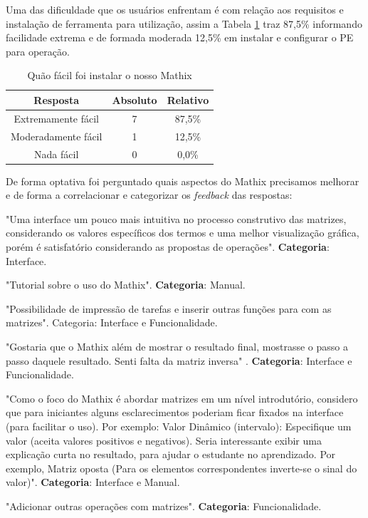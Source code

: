 Uma das dificuldade que os usuários enfrentam é com relação aos requisitos e instalação de ferramenta para utilização, assim a Tabela \ref{tab:ui-5} traz 87,5\% informando facilidade extrema e de formada moderada 12,5\% em instalar e configurar o PE para operação.

\begin{table}[h!]
    \centering
    \caption{Quão fácil foi instalar o nosso Mathix}
    \begin{tabular}{c|c|c}
        \textbf{Resposta} &	\textbf{Absoluto} & \textbf{Relativo} \\
        \hline
        Extremamente fácil & 7 & 87,5\% \\
        \hline
        Moderadamente fácil & 1 & 12,5\% \\
        \hline
        Nada fácil & 0 & 0,0\% \\
    \end{tabular}
    \label{tab:ui-5}
\end{table}

De forma optativa foi perguntado quais aspectos do Mathix precisamos melhorar e de forma a correlacionar e categorizar os \textit{feedback} das respostas:

\begin{citacao}
    \item "Uma interface um pouco mais intuitiva no processo construtivo das matrizes, considerando os valores específicos dos termos e uma melhor visualização gráfica, porém é satisfatório considerando as propostas de operações". \textbf{Categoria}: Interface.
    
    \item "Tutorial sobre o uso do Mathix". \textbf{Categoria}: Manual.
    
    \item "Possibilidade de impressão de tarefas e inserir outras funções para com as matrizes". Categoria: Interface e Funcionalidade.
    
    \item "Gostaria que o Mathix além de mostrar o resultado final, mostrasse o passo a passo daquele resultado. Senti falta da matriz inversa" . \textbf{Categoria}: Interface e Funcionalidade.
    
    \item "Como o foco do Mathix é abordar matrizes em um nível introdutório, considero que para iniciantes alguns esclarecimentos poderiam ficar fixados na interface (para facilitar o uso). Por exemplo: Valor Dinâmico (intervalo): Especifique um valor (aceita valores positivos e negativos). Seria interessante exibir uma explicação curta no resultado, para ajudar o estudante no aprendizado. Por exemplo, Matriz oposta (Para os elementos correspondentes inverte-se o sinal do valor)". \textbf{Categoria}: Interface e Manual.
    
    \item "Adicionar outras operações com matrizes". \textbf{Categoria}: Funcionalidade.
\end{citacao}


